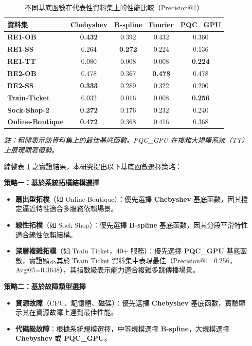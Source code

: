 \documentclass[10pt,a4paper,twocolumn]{article}
\begin{document}
\begin{table}[htbp]
\centering
\caption{不同基底函數在代表性資料集上的性能比較（Precision@1）}
\label{tab:basis_comparison}
\small
\begin{tabular}{l|cccc}
\toprule
\textbf{資料集} & \textbf{Chebyshev} & \textbf{B-spline} & \textbf{Fourier} & \textbf{PQC\_GPU} \\
\midrule
\textbf{RE1-OB} & \textbf{0.432} & 0.392 & 0.432 & 0.360 \\
\textbf{RE1-SS} & 0.264 & \textbf{0.272} & 0.224 & 0.136 \\
\textbf{RE1-TT} & 0.080 & 0.008 & 0.008 & \textbf{0.224} \\
\midrule
\textbf{RE2-OB} & 0.478 & 0.367 & \textbf{0.478} & 0.478 \\
\textbf{RE2-SS} & \textbf{0.333} & 0.289 & 0.322 & 0.200 \\
\midrule
\textbf{Train-Ticket} & 0.032 & 0.016 & 0.008 & \textbf{0.256} \\
\textbf{Sock-Shop-2} & \textbf{0.272} & 0.176 & 0.232 & 0.240 \\
\textbf{Online-Boutique} & \textbf{0.472} & 0.368 & 0.416 & 0.368 \\
\bottomrule
\end{tabular}
\vspace{0.2cm}

\small \textit{註：粗體表示該資料集上的最佳基底函數。PQC\_GPU 在複雜大規模系統（TT）上展現顯著優勢。}
\end{table}

綜整表 \ref{tab:basis_comparison} 之實證結果，本研究提出以下基底函數選擇策略：

\textbf{策略一：基於系統拓樸結構選擇}
\begin{itemize}
\item \textbf{扇出型拓樸}（如 Online Boutique）：優先選擇 \textbf{Chebyshev} 基底函數，因其穩定逼近特性適合多服務依賴場景。
\item \textbf{線性拓樸}（如 Sock Shop）：優先選擇 \textbf{B-spline} 基底函數，因其分段平滑特性適合線性依賴結構。
\item \textbf{深層複雜拓樸}（如 Train Ticket，40+ 服務）：優先選擇 \textbf{PQC\_GPU} 基底函數，實證顯示其於 Train Ticket 資料集中表現最佳（Precision@1=0.256，Avg@5=0.3648），其指數級表示能力適合複雜多跳傳播場景。
\end{itemize}

\textbf{策略二：基於故障類型選擇}
\begin{itemize}
\item \textbf{資源故障}（CPU、記憶體、磁碟）：優先選擇 \textbf{Chebyshev} 基底函數，實驗顯示其在資源故障上達到最佳性能。
\item \textbf{代碼級故障}：根據系統規模選擇，中等規模選擇 \textbf{B-spline}，大規模選擇 \textbf{Chebyshev} 或 \textbf{PQC\_GPU}。
\end{itemize}
\end{document}
